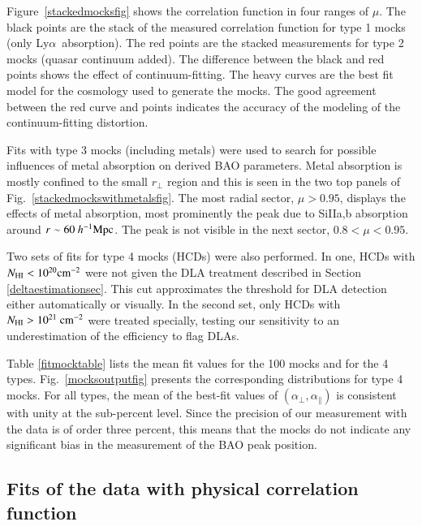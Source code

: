 \documentclass{aa}
\newcommand{\apar}{\alpha_\parallel}
\newcommand{\aperp}{\alpha_\perp}
\newcommand{\hMpc}{h^{-1}{\rm Mpc}}
\newcommand{\Lya}{Ly$\alpha$~}
\newcommand{\rperp}{r_\perp}
\newcommand{\NHI}{N_{\rm HI}}
\begin{document}
Figure~\ref{stackedmocksfig} shows the correlation
function in four ranges of $\mu$.
The black points are the stack of the
measured correlation function for type 1 mocks
(only \Lya absorption).
The red points are the stacked measurements for type 2 mocks
(quasar continuum added).
The difference between the black and red points shows the effect
of continuum-fitting.
The heavy curves are the best fit model for the cosmology used
to generate the mocks.
The good agreement between the red curve and points indicates
the accuracy of the modeling of the continuum-fitting distortion.



Fits with type 3 mocks (including metals) were used to search for
possible influences of metal absorption on derived BAO parameters.
Metal absorption is mostly confined to the small $\rperp$ region
and this is seen in the two top panels of Fig.~\ref{stackedmockswithmetalsfig}.
The most radial sector, $\mu>0.95$, displays the effects of
metal absorption, most prominently the peak due to SiIIa,b absorption
around $r\sim60~\hMpc$.  The peak is not visible in the next sector,
$0.8<\mu<0.95$.

Two sets of fits for type 4 mocks (HCDs) were also performed.
In one,
HCDs with $\NHI<10^{20}{\rm cm^{-2}}$ were not given the DLA treatment
described in Section \ref{deltaestimationsec}. 
This cut approximates the  threshold
for DLA detection either automatically or visually.
In the second set, only HCDs with $\NHI>10^{21}~{\rm cm^{-2}}$ were
treated specially, 
testing our sensitivity to an underestimation of 
the efficiency to flag DLAs.

Table \ref{fitmocktable} lists the mean fit values for the 100 mocks
and for the 4 types.
Fig.~\ref{mocksoutputfig}
presents the corresponding distributions for type 4 mocks.
For all types, the mean of the best-fit values of  $(\aperp,\apar)$ 
is consistent with unity at the sub-percent level.
Since the precision of our measurement with the data is of order three percent,
this means that the mocks do not indicate any significant bias in
the measurement of the BAO peak
position.




\subsection{Fits of the data with physical correlation function}
\label{dataanalysissec}
\end{document}
